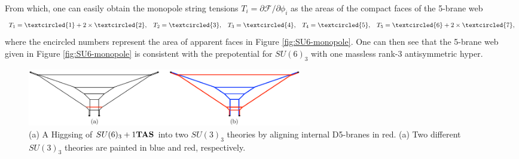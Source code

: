 From which, one can easily obtain the monopole string tensions $T_i=\partial{\mathcal{F}}/\partial{\phi_i}$ as the areas of the compact faces of the 5-brane web 
\begin{align}
T_1=\textcircled{\scriptsize 1} + 2\times\textcircled{\scriptsize 2},  %
&& T_2=\textcircled{\scriptsize 3}, %
&&T_3=\textcircled{\scriptsize 4}, %
&&T_4=\textcircled{\scriptsize 5}, %
&&T_5=\textcircled{\scriptsize 6} 
	+ 2\times\textcircled{\scriptsize 7},
\end{align}
where the encircled numbers represent the area of apparent faces in Figure \ref{fig:SU6-monopole}.
One can then see that the 5-brane web given in Figure \ref{fig:SU6-monopole} is consistent with the prepotential for $SU(6)_3$ with one massless rank-3 antisymmetric hyper.

\begin{figure}[t]
\centering
\includegraphics[width=12cm]{SU6-Higgsing.pdf}
\caption{(a) A Higgsing of $SU(6)_3+1{\bf TAS}$ into two $SU(3)_3$ theories by aligning internal D5-branes in red. (a) Two different $SU(3)_3$ theories are painted in blue and red, respectively. %
}
\label{fig:SU6-Higgsing}
\end{figure}
 
